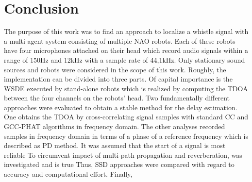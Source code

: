 \chapter{Conclusion}
\label{chap:05_conclusion}

\begin{comment}
    - Objective of this work:
        x a whistle sound locator (in xy-plane) with multiple robots
        x stationary robots and sources
        x evaluated different tdoa methods
        - found a approach to detect direction of source on single robots
\end{comment}

The purpose of this work was to find an approach to localize a whistle
signal with a multi-agent system consisting of multiple NAO robots.
Each of these robots have four microphones attached on their head which
record audio signals within a range of 150\si{\hertz} and 12\si{\kilo\hertz}
with a sample rate of 44,1\si{\kilo\hertz}.
Only stationary sound sources and robots were considered in the scope of this
work.
Roughly, the implementation can be divided into three parts.
Of capital importance is the \acf{WSDE} executed by stand-alone robots which
is realized by computing the \ac{TDOA} between the four channels on the robots' head.
Two fundamentally different approaches were evaluated to obtain a stable method
for the delay estimation.
One obtains the \ac{TDOA} by cross-correlating signal samples with standard
\acf{CC} and \acf{GCC-PHAT} algorithms in frequency domain.
The other analyses recorded samples in frequency domain in terms of
a phase of a reference frequency which is described as \acf{PD} method.
It was assumed that the start of a signal is most reliable 
To circumvent impact of multi-path propagation and reverberation, 
was investigated and is true
Thus, \acf{SSD} approaches were compared with regard to accuracy and computational effort.
Finally, 






